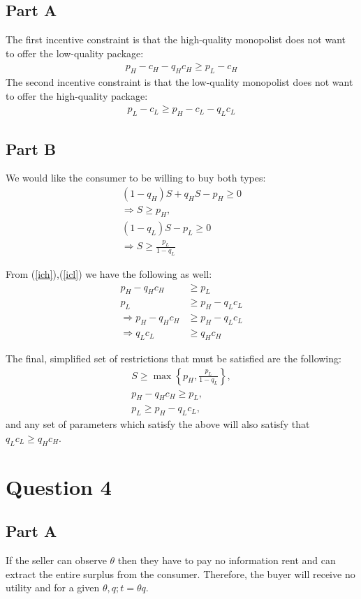 \documentclass[11pt]{article} %
\begin{document}
\subsection{Part A}
The first incentive constraint is that the high-quality monopolist does not want to offer the low-quality package:
\begin{align}
p_H - c_H - q_Hc_H \geq p_L - c_H \label{ich}
\end{align}
The second incentive constraint is that the low-quality monopolist does not want to offer the high-quality package:
\begin{align}
p_L - c_L \geq p_H - c_L - q_Lc_L \label{icl}
\end{align}
\subsection{Part B}
We would like the consumer to be willing to buy both types:
\begin{align*}
(1-q_H)S + q_HS - p_H \geq 0\\
\Rightarrow S\geq p_H, \\
(1-q_L)S -p_L \geq 0\\
\Rightarrow S\geq \frac{p_L}{1-q_L}
\end{align*}

From (\ref{ich}),(\ref{icl}) we have the following as well:
\begin{align*}
p_H - q_Hc_H &\geq p_L\\
p_L &\geq p_H - q_Lc_L\\
\Rightarrow p_H - q_Hc_H &\geq p_H - q_Lc_L\\
\Rightarrow q_Lc_L &\geq q_Hc_H
\end{align*}

The final, simplified set of restrictions that must be satisfied are the following:
\begin{align}
S \geq \max \left\{p_H,\frac{p_L}{1-q_L}\right\},\\
p_H  - q_Hc_H \geq p_L, \\
p_L  \geq p_H - q_Lc_L,
\end{align}
and any set of parameters which satisfy the above will also satisfy that $q_Lc_L\geq q_Hc_H$.
\section{Question 4}
\subsection{Part A}
If the seller can observe $\theta$ then they have to pay no information rent and can extract the entire surplus from the consumer. Therefore, the buyer will receive no utility and for a given $\theta,q; t=\theta q.$
\end{document}
